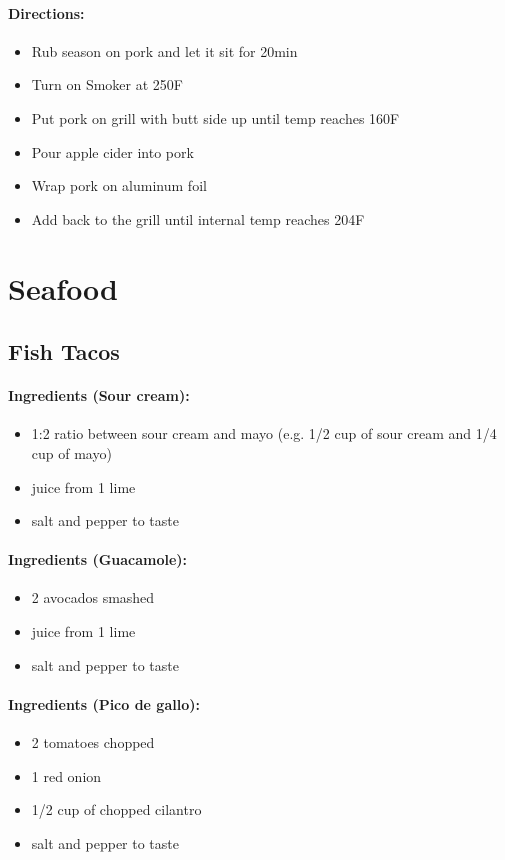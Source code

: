 \documentclass{article}
\begin{document}
\paragraph{Directions:}
\begin{itemize}
    \item Rub season on pork and let it sit for 20min
    \item Turn on Smoker at 250F
    \item Put pork on grill with butt side up until temp reaches 160F
    \item Pour apple cider into pork
    \item Wrap pork on aluminum foil
    \item Add back to the grill until internal temp reaches 204F
\end{itemize}

\section{Seafood}


\subsection{Fish Tacos} 

\paragraph{Ingredients (Sour cream):}
\begin{itemize}
    \item 1:2 ratio between sour cream and mayo (e.g. 1/2 cup of sour cream and 1/4 cup of mayo)
    \item juice from 1 lime
    \item salt and pepper to taste
\end{itemize}  

\paragraph{Ingredients (Guacamole):}
\begin{itemize}
    \item 2 avocados smashed
    \item juice from 1 lime
    \item salt and pepper to taste
\end{itemize}  

\paragraph{Ingredients (Pico de gallo):}
\begin{itemize}
    \item 2 tomatoes chopped
    \item 1 red onion
    \item 1/2 cup of chopped cilantro
    \item salt and pepper to taste
\end{itemize}  
\end{document}
